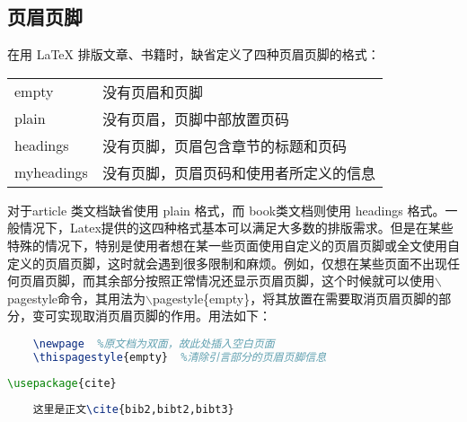 \documentclass[cn,10pt,math=newtx,citestyle=gb7714-2015,bibstyle=gb7714-2015]{elegantbook}
\begin{document}
\subsection{页眉页脚}

在用 LaTeX 排版文章、书籍时，缺省定义了四种页眉页脚的格式：

\begin{table}[h]
	\centering
	\begin{tabular}{ll}
		empty      & 没有页眉和页脚              \\
		plain      & 没有页眉，页脚中部放置页码        \\
		headings   & 没有页脚，页眉包含章节的标题和页码    \\
		myheadings & 没有页脚，页眉页码和使用者所定义的信息 
	\end{tabular}
\end{table}

对于article 类文档缺省使用 plain 格式，而 book类文档则使用 headings 格式。一般情况下，Latex提供的这四种格式基本可以满足大多数的排版需求。但是在某些特殊的情况下，特别是使用者想在某一些页面使用自定义的页眉页脚或全文使用自定义的页眉页脚，这时就会遇到很多限制和麻烦。例如，仅想在某些页面不出现任何页眉页脚，而其余部分按照正常情况还显示页眉页脚，这个时候就可以使用$\backslash$pagestyle命令，其用法为$\backslash$pagestyle\{empty\}，将其放置在需要取消页眉页脚的部分，变可实现取消页眉页脚的作用。用法如下：
\begin{lstlisting}[language=tex]
	%   %引言部分
	\newpage  %原文档为双面，故此处插入空白页面
	\thispagestyle{empty}  %清除引言部分的页眉页脚信息
\end{lstlisting}
\begin{lstlisting}[language=tex]
	\usepackage{cite}
	
	这里是正文\cite{bib2,bibt2,bibt3}
\end{lstlisting}
\end{document}
